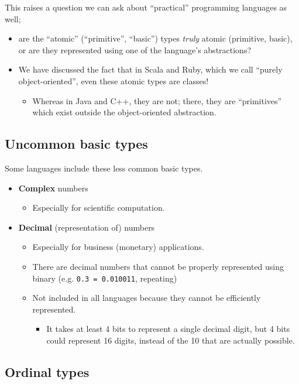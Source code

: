 \documentclass[11pt]{article}
\theoremstyle{definition}
\begin{document}
This raises a question we can ask about
“practical” programming languages as well;
\begin{itemize}
\item are the “atomic” (“primitive”, “basic”) types \emph{truly} atomic
(primitive, basic), or are they represented
using one of the language's abstractions?
\item We have discussed the fact that in Scala and Ruby, which we call
“purely object-oriented”, even these atomic types are classes!
\begin{itemize}
\item Whereas in Java and C++, they are not;
there, they are “primitives” which exist
outside the object-oriented abstraction.
\end{itemize}
\end{itemize}

\subsection{Uncommon basic types}
\label{sec:orgfe5a8a9}

Some languages include these less common basic types.
\begin{itemize}
\item \textbf{Complex} numbers
\begin{itemize}
\item Especially for scientific computation.
\end{itemize}
\item \textbf{Decimal} (representation of) numbers
\begin{itemize}
\item Especially for business (monetary) applications.
\item There are decimal numbers that cannot be properly represented
using binary (e.g. \texttt{0.3 = 0.010011}, repeating)
\item Not included in all languages because
they cannot be efficiently represented.
\begin{itemize}
\item It takes at least 4 bits to represent a single decimal digit,
but 4 bits could represent 16 digits, instead of the 10
that are actually possible.
\end{itemize}
\end{itemize}
\end{itemize}

\subsection{Ordinal types}
\label{sec:org63241e0}
\end{document}
